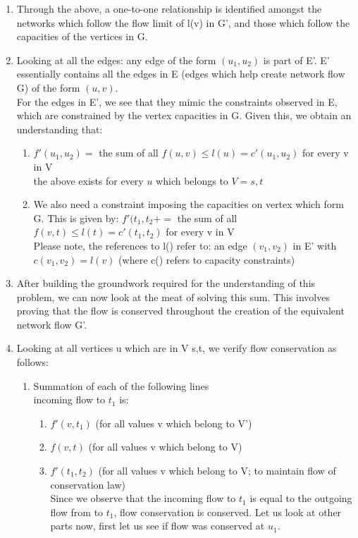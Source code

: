 \documentclass[11pt]{article}
\begin{document}
\begin{enumerate}
\begin{enumerate}
\begin{enumerate}
    \end{enumerate}
    \item Through the above, a one-to-one relationship is identified amongst the networks which follow the flow limit of l(v) in G', and those which follow the capacities of the vertices in G. 
    \item Looking at all the edges: any edge of the form $(u_1, u_2)$ is part of E'. E' essentially contains all the edges in E (edges which help create network flow G) of the form $(u, v)$. \\
    For the edges in E', we see that they mimic the constraints observed in E, which are constrained by the vertex capacities in G. Given this, we obtain an understanding that:
    \begin{enumerate}
        \item $f'(u_1, u_2) = $ the sum of all $f(u, v) \leq l(u) = c'(u_1, u_2)$ for every v in V \\the above exists for every $u$ which belongs to $V = {s,t}$
        \item We also need a constraint imposing the capacities on vertex which form G. This is given by:  $f'(t_1, t_2+ = $ the sum of all $f(v,t) \leq l(t) = c'(t_1, t_2)$ for every v in V\\ 
        Please note, the references to l() refer to: an edge $(v_1, v_2)$ in E' with $c(v_1, v_2) = l(v)$ (where c() refers to capacity constraints)
    \end{enumerate}
    \item After building the groundwork required for the understanding of this problem, we can now look at the meat of solving this sum. This involves proving that the flow is conserved throughout the creation of the equivalent network flow G'.
    \item Looking at all vertices u which are in V {s,t}, we verify flow conservation as follows:
    \begin{enumerate}
        \item Summation of each of the following lines\\
        incoming flow to $t_1$ is: 
        \begin{enumerate}
            \item $f'(v, t_1)$ (for all values v which belong to V')
            \item $f(v, t)$ (for all values v which belong to V)
            \item $f'(t_1, t_2)$ (for all values v which belong to V; to maintain flow of conservation law)
            \\Since we observe that the incoming flow to $t_1$ is equal to the outgoing flow from to $t_1$, flow conservation is conserved. Let us look at other parts now, first let us see if flow was conserved at $u_1$.
        \end{enumerate}
    \end{enumerate}
    

\end{enumerate}
\end{enumerate}
\end{document}

